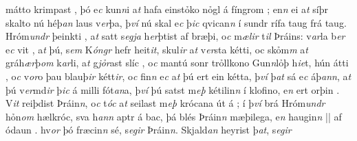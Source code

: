 mátto  krimpast  , þó  e\textit{c} kun\textit{n}i a\textit{t} hafa  einstỏko nỏgl á fíngrom  ; en\textit{n} ei  a\textit{t} síþr skalto nú   héþ\textit{an} laus v\textit{er}þa, þ\textit{ví} nú skal e\textit{c}
þ\textit{ic}  qvican\textit{n} í sundr rífa  taug   frá taug. 
Hróm\textit{undr}  þeinkti  , a\textit{t}  satt s\textit{egja}  h\textit{er}þtist   af   bræþi, o\textit{c} m\textit{ælir}
t\textit{il} Þráins: v\textit{ar}la b\textit{er} e\textit{c} vit  ,  a\textit{t} þú, s\textit{em} K\textit{óngr} hefr heit\textit{it},
skul\textit{ir}  a\textit{t} v\textit{er}sta kétti, oc   skỏm\textit{m} a\textit{t}  gráh\textit{ær}þ\textit{om} k\textit{ar}li, a\textit{t} g\textit{jỏr}ast
slíc   , o\textit{c} mantú sonr trỏllkono   Gun\textit{n}lỏþ h\textit{ie}t, 
hún átti  , o\textit{c} v\textit{or}o þau    blauþ\textit{ir}  kétt\textit{ir},
o\textit{c} fin\textit{n} e\textit{c} a\textit{t} þú ert  ein
kétta, þ\textit{ví} þ\textit{at} sá e\textit{c} áþ\textit{an}\textit{n},
a\textit{t} þú  v\textit{er}md\textit{ir} 
þ\textit{ic} á milli fót\textit{an}a,  þ\textit{ví} þú satst
m\textit{eþ} kétilin\textit{n} í klofino, e\textit{n} ert orþin  . 
V\textit{it}  reiþdist Þráin\textit{n}, o\textit{c} t\textit{óc} a\textit{t} seilast m\textit{eþ} krócana út á  ; í þ\textit{ví} brá Hróm\textit{undr} hỏn\textit{om} hælkróc, sva  h\textit{ann}  aptr á bac, þá blés Þráin\textit{n} mæþilega, e\textit{n} haugin\textit{n} 
||
 af ódaun  .   hv\textit{or} þó fræcin\textit{n} sé, s\textit{egir} Þráin\textit{n}. Skjald\textit{an} heyrist þ\textit{at}, s\textit{egir}

